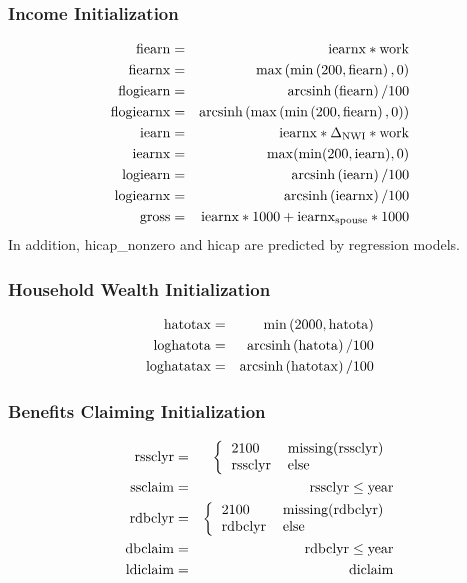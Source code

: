 \documentclass{article}
\begin{document}
\subsubsection{Income Initialization}
\label{sec:init}
\begin{eqnarray}
\rm fiearn &=& {\rm iearnx} * {\rm work}\\
\rm fiearnx &=& \max\left(\min\left(200, {\rm fiearn}\right), 0\right)\\
\rm flogiearn &=& {\rm arcsinh}\left(\rm fiearn\right)/100\\
\rm flogiearnx &=& {\rm arcsinh}\left(\max\left(\min\left(200, {\rm fiearn}\right), 0\right)\right)\\
\rm iearn &=& {\rm iearnx} * \Delta_{\rm NWI} * {\rm work}\\
\rm iearnx &=& \max(\min(200, {\rm iearn}), 0)\\
\rm logiearn &=& {\rm arcsinh}\left(\rm iearn\right)/100\\
\rm logiearnx &=& {\rm arcsinh}\left(\rm iearnx\right)/100\\
\rm gross &=& {\rm iearnx} * 1000 + {\rm iearnx}_{\rm spouse} * 1000
\end{eqnarray}
In addition, hicap\_nonzero and hicap are predicted by regression
models.

\subsubsection{Household Wealth Initialization}
\begin{eqnarray}
\rm hatotax &=& \min\left(2000, {\rm hatota}\right)\\
\rm loghatota &=& {\rm arcsinh}\left(\rm hatota\right)/100\\
\rm loghatatax &=& {\rm arcsinh}\left(\rm hatotax\right)/100
\end{eqnarray}

\subsubsection{Benefits Claiming Initialization}
\begin{eqnarray}
\rm rssclyr &=& \left\{ \begin{tabular}{ll}2100&{\rm
      missing(rssclyr)}\\rssclyr&{\rm else}\end{tabular}\right.\\
\rm ssclaim &=& {\rm rssclyr} \leq {\rm year}\\
\rm rdbclyr &=& \left\{ \begin{tabular}{ll}2100&{\rm
      missing(rdbclyr)}\\rdbclyr&{\rm else}\end{tabular}\right.\\
\rm dbclaim &=& {\rm rdbclyr} \leq {\rm year}\\
\rm ldiclaim &=& \rm diclaim
\end{eqnarray}
\end{document}
